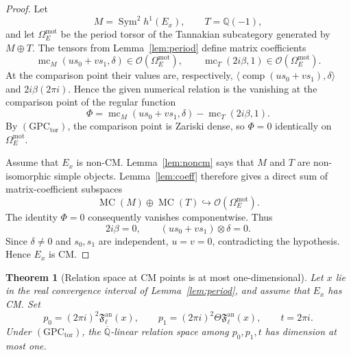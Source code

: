 \documentclass[11pt,a4paper]{amsart} %
\newtheorem{theorem}{Theorem}[section]
\theoremstyle{definition}
\newcommand{\Q}{\mathbb Q}
\newcommand{\Qbar}{\overline{\mathbb Q}}
\newcommand{\Sym}{\operatorname{Sym}}
\begin{document}
\begin{proof}
Let
\[
M=\Sym^2h^1(E_x),\qquad T=\Q(-1),
\]
and let \(\Omega_E^{\mathrm{mot}}\) be the period torsor of the Tannakian
subcategory generated by \(M\oplus T\). The tensors from
Lemma~\ref{lem:period} define matrix coefficients
\[
\operatorname{mc}_M(us_0+vs_1,\delta)
\in\mathcal O(\Omega_E^{\mathrm{mot}}),
\qquad
\operatorname{mc}_T(2i\beta,1)
\in\mathcal O(\Omega_E^{\mathrm{mot}}).
\]
At the comparison point their values are, respectively,
\(\langle\operatorname{comp}(us_0+vs_1),\delta\rangle\) and
\(2i\beta(2\pi i)\). Hence the given numerical relation is the vanishing at
the comparison point of the regular function
\[
\Phi=
\operatorname{mc}_M(us_0+vs_1,\delta)
-
\operatorname{mc}_T(2i\beta,1).
\]
By \((\mathrm{GPC}_{\mathrm{tor}})\), the comparison point is Zariski dense,
so \(\Phi=0\) identically on \(\Omega_E^{\mathrm{mot}}\).

Assume that \(E_x\) is non-CM. Lemma~\ref{lem:noncm} says that \(M\) and
\(T\) are non-isomorphic simple objects. Lemma~\ref{lem:coeff} therefore
gives a direct sum of matrix-coefficient subspaces
\[
\operatorname{MC}(M)\oplus\operatorname{MC}(T)
\hookrightarrow\mathcal O(\Omega_E^{\mathrm{mot}}).
\]
The identity \(\Phi=0\) consequently vanishes componentwise. Thus
\[
2i\beta=0,
\qquad
(us_0+vs_1)\otimes\delta=0.
\]
Since \(\delta\ne0\) and \(s_0,s_1\) are independent,
\(u=v=0\), contradicting the hypothesis. Hence \(E_x\) is CM.
\end{proof}

\begin{theorem}[Relation space at CM points is at most one-dimensional]\label{thm:unique}
Let \(x\) lie in the real convergence interval of Lemma~\ref{lem:period},
and assume that \(E_x\) has CM. Set
\[
p_0=(2\pi i)^2{\mathfrak F}^{\mathrm{an}}_\ell(x),
\qquad
p_1=(2\pi i)^2\Theta{\mathfrak F}^{\mathrm{an}}_\ell(x),
\qquad
t=2\pi i.
\]
Under \((\mathrm{GPC}_{\mathrm{tor}})\), the \(\Qbar\)-linear relation
space among \(p_0,p_1,t\) has dimension at most one.
\end{theorem}
\end{document}
